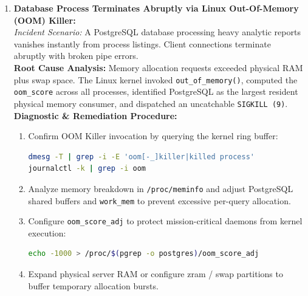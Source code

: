 \begin{enumerate}[label=\textbf{Case \arabic*.},leftmargin=1.5cm]
\item \textbf{Database Process Terminates Abruptly via Linux Out-Of-Memory (OOM) Killer:} \\
\textit{Incident Scenario:} A PostgreSQL database processing heavy analytic reports vanishes instantly from process listings. Client connections terminate abruptly with broken pipe errors. \\
\textbf{Root Cause Analysis:} Memory allocation requests exceeded physical RAM plus swap space. The Linux kernel invoked \texttt{out\_of\_memory()}, computed the \texttt{oom\_score} across all processes, identified PostgreSQL as the largest resident physical memory consumer, and dispatched an uncatchable \texttt{SIGKILL (9)}. \\
\textbf{Diagnostic \& Remediation Procedure:}
\begin{enumerate}
    \item Confirm OOM Killer invocation by querying the kernel ring buffer:
\begin{lstlisting}[language=bash]
dmesg -T | grep -i -E 'oom[-_]killer|killed process'
journalctl -k | grep -i oom
\end{lstlisting}
    \item Analyze memory breakdown in \texttt{/proc/meminfo} and adjust PostgreSQL shared buffers and \texttt{work\_mem} to prevent excessive per-query allocation.
    \item Configure \texttt{oom\_score\_adj} to protect mission-critical daemons from kernel execution:
\begin{lstlisting}[language=bash]
echo -1000 > /proc/$(pgrep -o postgres)/oom_score_adj
\end{lstlisting}
    \item Expand physical server RAM or configure zram / swap partitions to buffer temporary allocation bursts.
\end{enumerate}


\end{enumerate}

